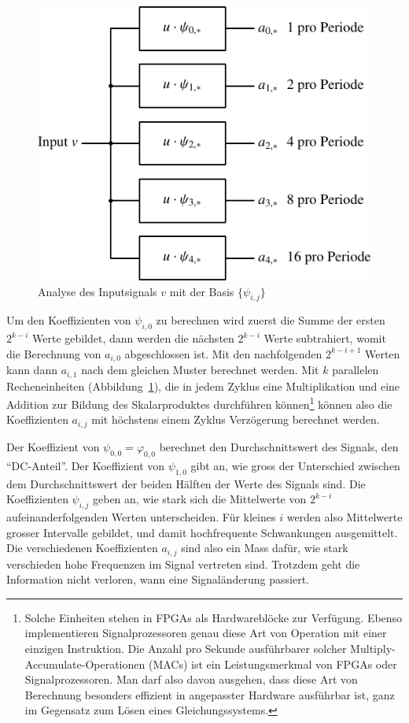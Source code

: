 \begin{figure}
\begin{center}
\includegraphics[width=0.65\hsize]{images/signal-2}
\end{center}
\caption{Analyse des Inputsignals $v$ mit der Basis $\{\psi_{i,j}\}$
\label{waveletanalysis}}
\end{figure}
Um den Koeffizienten von $\psi_{i,0}$ zu berechnen wird zuerst
die Summe der ersten $2^{k-i}$ Werte gebildet, dann werden die
nächsten $2^{k-i}$ Werte subtrahiert, womit die Berechnung von $a_{i,0}$
abgeschlossen ist. Mit den nachfolgenden $2^{k-i+1}$ Werten kann dann
$a_{i,1}$ nach dem gleichen Muster berechnet werden. Mit $k$ parallelen
Recheneinheiten (Abbildung~\ref{waveletanalysis}),
die in jedem Zyklus eine Multiplikation und eine Addition zur
Bildung des Skalarproduktes durchführen können\footnote{Solche 
Einheiten stehen in FPGAs als Hardwareblöcke zur Verfügung. Ebenso
implementieren Signalprozessoren genau diese Art von Operation
mit einer einzigen Instruktion.
Die Anzahl pro Sekunde ausführbarer solcher
Multiply-Accumulate-Operationen (MACs)
ist ein Leistungsmerkmal von FPGAs oder Signalprozessoren.
Man darf also davon ausgehen,
dass diese Art von Berechnung besonders effizient in angepasster
Hardware ausführbar ist, ganz im Gegensatz zum Lösen eines
Gleichungssystems.}
können also die Koeffizienten $a_{i,j}$ mit höchstens
einem Zyklus Verzögerung berechnet werden.

Der Koeffizient von $\psi_{0,0}=\varphi_{0,0}$ berechnet
den Durchschnittswert des Signals, den ``DC-Anteil''.
Der Koeffizient von $\psi_{1,0}$ gibt an, wie gross der Unterschied 
zwischen dem Durchschnittswert der beiden Hälften der Werte
des Signals sind.
Die Koeffizienten $\psi_{i,j}$ geben an, wie stark sich die Mittelwerte
von $2^{k-i}$ aufeinanderfolgenden Werten unterscheiden.
Für kleines $i$ werden also Mittelwerte grosser Intervalle
gebildet, und damit hochfrequente Schwankungen ausgemittelt.
Die verschiedenen Koeffizienten $a_{i,j}$ sind also ein Mass
dafür, wie stark verschieden hohe Frequenzen im Signal
vertreten sind. Trotzdem geht die Information nicht verloren,
wann eine Signaländerung passiert.

